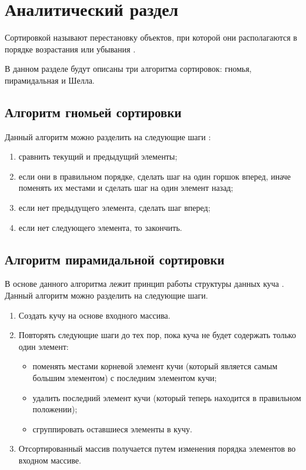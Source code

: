\chapter{Аналитический раздел}

Сортировкой называют перестановку объектов, при которой они располагаются в порядке возрастания или убывания \cite{knut}.

В данном разделе будут описаны три алгоритма сортировок: гномья, пирамидальная и Шелла.

\section{Алгоритм гномьей сортировки}
Данный алгоритм можно разделить на следующие шаги \cite{gnome}:

\begin{enumerate}
	\item сравнить текущий и предыдущий элементы;
	\item если они в правильном порядке, сделать шаг на один горшок вперед, иначе поменять их местами и сделать шаг на один элемент назад;
	\item если нет предыдущего элемента, сделать шаг вперед;
	\item если нет следующего элемента, то закончить.
\end{enumerate}


\section{Алгоритм пирамидальной сортировки}

В основе данного алгоритма лежит принцип работы структуры данных куча \cite{heap}.
Данный алгоритм можно разделить на следующие шаги.

\begin{enumerate}
	\item Создать кучу на основе входного массива.
	\item Повторять следующие шаги до тех пор, пока куча не будет содержать только один элемент:
	\begin{itemize}
		\item поменять местами корневой элемент кучи (который является самым большим элементом) с последним элементом кучи;
		\item удалить последний элемент кучи (который теперь находится в правильном положении);
		\item сгруппировать оставшиеся элементы в кучу.
	\end{itemize}
	\item Отсортированный массив получается путем изменения порядка элементов во входном массиве.
\end{enumerate}


